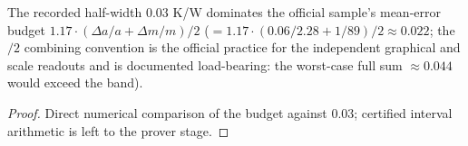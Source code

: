 \begin{theorem}
\label{thm:IPhO2026Problems_problem_IPhO_2026_4_C_6:official_sample_uncertainty}
The recorded half-width $0.03$ K/W dominates the official sample's mean-error
budget $1.17 \cdot (\Delta a/a + \Delta m/m)/2$
($= 1.17 \cdot (0.06/2.28 + 1/89)/2 \approx 0.022$; the $/2$ combining
convention is the official practice for the independent graphical and scale
readouts and is documented load-bearing: the worst-case full sum
$\approx 0.044$ would exceed the band).
\end{theorem}
\begin{proof}
Direct numerical comparison of the budget against $0.03$; certified interval
arithmetic is left to the prover stage.
\end{proof}

